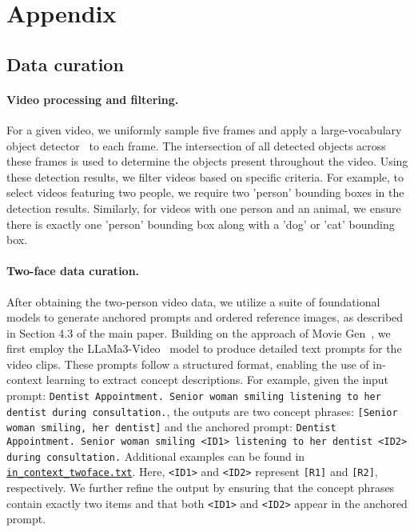 
\appendix

\section{Appendix}
\subsection{Data curation}

\paragraph{Video processing and filtering.}
For a given video, we uniformly sample five frames and apply a large-vocabulary object detector~\cite{zhou2022detecting} to each frame. The intersection of all detected objects across these frames is used to determine the objects present throughout the video. Using these detection results, we filter videos based on specific criteria. For example, to select videos featuring two people, we require two 'person' bounding boxes in the detection results. Similarly, for videos with one person and an animal, we ensure there is exactly one 'person' bounding box along with a 'dog' or 'cat' bounding box.

\paragraph{Two-face data curation.}
After obtaining the two-person video data, we utilize a suite of foundational models to generate anchored prompts and ordered reference images, as described in Section 4.3 of the main paper. Building on the approach of Movie Gen~\cite{moviegen}, we first employ the LLaMa3-Video~\cite{dubey2024llama} model to produce detailed text prompts for the video clips. These prompts follow a structured format, enabling the use of in-context learning to extract concept descriptions.
For example, given the input prompt: \texttt{Dentist Appointment. Senior woman smiling listening to her dentist during consultation.}, the outputs are two concept phrases: \texttt{[Senior woman smiling, her dentist]} and the anchored prompt: \texttt{Dentist Appointment. Senior woman smiling \textless{}ID1\textgreater{} listening to her dentist \textless{}ID2\textgreater{} during consultation.} Additional examples can be found in \href{https://jeff-liangf.github.io/projects/movieweaver/supp/in_context_twoface.txt}{\texttt{in\_context\_twoface.txt}}. Here, \texttt{\textless{}ID1\textgreater{}} and \texttt{\textless{}ID2\textgreater{}} represent \texttt{[R1]} and \texttt{[R2]}, respectively.
We further refine the output by ensuring that the concept phrases contain exactly two items and that both \texttt{\textless{}ID1\textgreater{}} and \texttt{\textless{}ID2\textgreater{}} appear in the anchored prompt.

